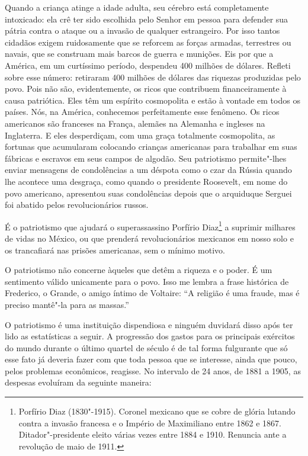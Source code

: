 Quando a criança atinge a idade adulta, seu cérebro está completamente
intoxicado: ela crê ter sido escolhida pelo Senhor em pessoa para
defender sua pátria contra o ataque ou a invasão de qualquer
estrangeiro. Por isso tantos cidadãos exigem ruidosamente que se
reforcem as forças armadas, terrestres ou navais, que se construam mais
barcos de guerra e munições. Eis por que a América, em um curtíssimo
período, despendeu 400 milhões de dólares. Refleti sobre esse
número: retiraram 400 milhões de dólares das riquezas
produzidas pelo povo. Pois não são, evidentemente, os ricos que
contribuem financeiramente à causa patriótica. Eles têm um espírito
cosmopolita e estão à vontade em todos os países. Nós, na América,
conhecemos perfeitamente esse fenômeno. Os ricos americanos são
franceses na França, alemães na Alemanha e ingleses na Inglaterra. E
eles desperdiçam, com uma graça totalmente cosmopolita, as fortunas que
acumularam colocando crianças americanas para trabalhar em suas
fábricas e escravos em seus campos de algodão. Seu patriotismo
permite"-lhes enviar mensagens de condolências a um déspota como o
czar da Rússia quando lhe acontece uma desgraça, como 
quando o presidente Roosevelt, em nome do povo americano, apresentou
suas condolências depois que o arquiduque Serguei foi abatido pelos
revolucionários russos.

É o patriotismo que ajudará o superassassino Porfírio Diaz\footnote{
Porfírio Diaz (1830"-1915). Coronel mexicano que se cobre de glória lutando
contra a invasão francesa e o Império de Maximiliano entre 1862 e 1867.
Ditador"-presidente eleito várias vezes entre 1884 e 1910. Renuncia
ante a revolução de maio de 1911.} a suprimir
milhares de vidas no México, ou que prenderá revolucionários
mexicanos em nosso solo e os trancafiará nas prisões americanas, sem o
mínimo motivo.

O patriotismo não concerne àqueles que detêm a riqueza e o poder. É um
sentimento válido unicamente para o povo. Isso me lembra a frase
histórica de Frederico, o Grande, o amigo íntimo de Voltaire: “A
religião é uma fraude, mas é preciso mantê"-la para as massas.” 

O patriotismo é uma instituição dispendiosa e ninguém duvidará disso
após ter lido as estatísticas a seguir. A progressão dos gastos
para os principais exércitos do mundo durante o último quartel de
século é de tal forma fulgurante que só esse fato já deveria fazer com
que toda pessoa que se interesse, ainda que pouco, pelos problemas
econômicos, reagisse. No intervalo de 24 anos, de 1881 a
1905, as despesas evoluíram da seguinte maneira:

